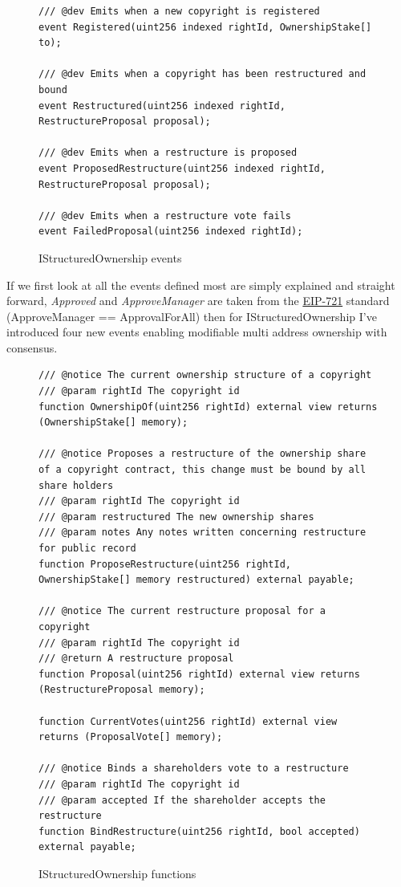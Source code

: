 \documentclass[12pt]{article}
\newcommand{\nft}[0]{\href{https://eips.ethereum.org/EIPS/eip-721}{EIP-721} }
\begin{document}
\begin{figure}[H]
\caption{IStructuredOwnership events}
\centering
\begin{lstlisting}[language=Solidity]
/// @dev Emits when a new copyright is registered
event Registered(uint256 indexed rightId, OwnershipStake[] to);

/// @dev Emits when a copyright has been restructured and bound
event Restructured(uint256 indexed rightId, RestructureProposal proposal);

/// @dev Emits when a restructure is proposed
event ProposedRestructure(uint256 indexed rightId, RestructureProposal proposal);

/// @dev Emits when a restructure vote fails
event FailedProposal(uint256 indexed rightId);
\end{lstlisting}
\end{figure}

If we first look at all the events defined most are simply explained and straight forward, \textit{Approved} and \textit{ApproveManager} are taken from the \nft standard (ApproveManager == ApprovalForAll) then for IStructuredOwnership I've introduced four new events enabling modifiable multi address ownership with consensus.


\begin{figure}[H]
\caption{IStructuredOwnership functions}
\centering
\begin{lstlisting}[language=Solidity]
/// @notice The current ownership structure of a copyright
/// @param rightId The copyright id
function OwnershipOf(uint256 rightId) external view returns (OwnershipStake[] memory);

/// @notice Proposes a restructure of the ownership share of a copyright contract, this change must be bound by all share holders
/// @param rightId The copyright id
/// @param restructured The new ownership shares
/// @param notes Any notes written concerning restructure for public record
function ProposeRestructure(uint256 rightId, OwnershipStake[] memory restructured) external payable;

/// @notice The current restructure proposal for a copyright
/// @param rightId The copyright id
/// @return A restructure proposal
function Proposal(uint256 rightId) external view returns (RestructureProposal memory);
    
function CurrentVotes(uint256 rightId) external view returns (ProposalVote[] memory);

/// @notice Binds a shareholders vote to a restructure
/// @param rightId The copyright id
/// @param accepted If the shareholder accepts the restructure
function BindRestructure(uint256 rightId, bool accepted) external payable;
\end{lstlisting}
\end{figure}
\end{document}
